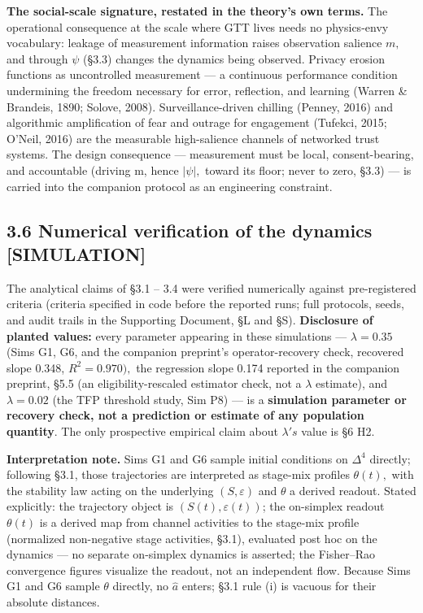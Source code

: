 \documentclass[
]{article}
\begin{document}
\textbf{The social-scale signature, restated in the theory's own terms.}
The operational consequence at the scale where GTT lives needs no
physics-envy vocabulary: leakage of measurement information raises
observation salience \(m,\) and through \(\psi\) (§3.3) changes the
dynamics being observed. Privacy erosion functions as uncontrolled
measurement --- a continuous performance condition undermining the
freedom necessary for error, reflection, and learning (Warren \&
Brandeis, 1890; Solove, 2008). Surveillance-driven chilling (Penney,
2016) and algorithmic amplification of fear and outrage for engagement
(Tufekci, 2015; O'Neil, 2016) are the measurable high-salience channels
of networked trust systems. The design consequence --- measurement must
be local, consent-bearing, and accountable (driving m, hence \(|\psi|,\)
toward its floor; never to zero, §3.3) --- is carried into the companion
protocol as an engineering constraint.

\subsection{3.6 Numerical verification of the dynamics
{[}SIMULATION{]}}\label{numerical-verification-of-the-dynamics-simulation}

The analytical claims of §3.1 -- 3.4 were verified numerically against
pre-registered criteria (criteria specified in code before the reported
runs; full protocols, seeds, and audit trails in the Supporting
Document, §L and §S). \textbf{Disclosure of planted values:} every
parameter appearing in these simulations --- \(\lambda = 0.35\) (Sims
G1, G6, and the companion preprint's operator-recovery check, recovered
slope 0.348, \(R^{2} = 0.970),\) the regression slope 0.174 reported in
the companion preprint, §5.5 (an eligibility-rescaled estimator check,
not a \(\lambda\) estimate), and \(\lambda = 0.02\) (the TFP threshold
study, Sim P8) --- is a \textbf{simulation parameter or recovery check,
not a prediction or estimate of any population quantity}. The only
prospective empirical claim about \(\lambda's\) value is §6 H2.

\textbf{Interpretation note.} Sims G1 and G6 sample initial conditions
on \(\Delta^{4}\) directly; following §3.1, those trajectories are
interpreted as stage-mix profiles \(\theta(t),\) with the stability law
acting on the underlying \((S, \varepsilon)\) and \(\theta\) a derived
readout. Stated explicitly: the trajectory object is
\((S(t), \varepsilon(t))\); the on-simplex readout \(\theta(t)\) is a
derived map from channel activities to the stage-mix profile (normalized
non-negative stage activities, §3.1), evaluated post hoc on the dynamics
--- no separate on-simplex dynamics is asserted; the Fisher--Rao
convergence figures visualize the readout, not an independent flow.
Because Sims G1 and G6 sample \(\theta\) directly, no \(\hat{a}\)
enters; §3.1 rule (i) is vacuous for their absolute distances.
\end{document}
